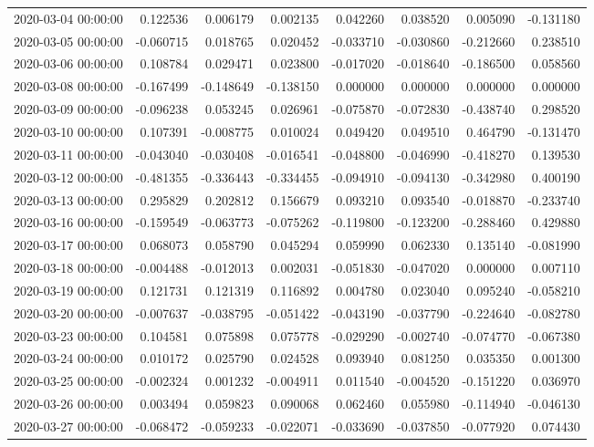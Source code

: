 \begin{tabular}{lrrrrrrr}
2020-03-04 00:00:00 & 0.122536 & 0.006179 & 0.002135 & 0.042260 & 0.038520 & 0.005090 & -0.131180 \\
2020-03-05 00:00:00 & -0.060715 & 0.018765 & 0.020452 & -0.033710 & -0.030860 & -0.212660 & 0.238510 \\
2020-03-06 00:00:00 & 0.108784 & 0.029471 & 0.023800 & -0.017020 & -0.018640 & -0.186500 & 0.058560 \\
2020-03-08 00:00:00 & -0.167499 & -0.148649 & -0.138150 & 0.000000 & 0.000000 & 0.000000 & 0.000000 \\
2020-03-09 00:00:00 & -0.096238 & 0.053245 & 0.026961 & -0.075870 & -0.072830 & -0.438740 & 0.298520 \\
2020-03-10 00:00:00 & 0.107391 & -0.008775 & 0.010024 & 0.049420 & 0.049510 & 0.464790 & -0.131470 \\
2020-03-11 00:00:00 & -0.043040 & -0.030408 & -0.016541 & -0.048800 & -0.046990 & -0.418270 & 0.139530 \\
2020-03-12 00:00:00 & -0.481355 & -0.336443 & -0.334455 & -0.094910 & -0.094130 & -0.342980 & 0.400190 \\
2020-03-13 00:00:00 & 0.295829 & 0.202812 & 0.156679 & 0.093210 & 0.093540 & -0.018870 & -0.233740 \\
2020-03-16 00:00:00 & -0.159549 & -0.063773 & -0.075262 & -0.119800 & -0.123200 & -0.288460 & 0.429880 \\
2020-03-17 00:00:00 & 0.068073 & 0.058790 & 0.045294 & 0.059990 & 0.062330 & 0.135140 & -0.081990 \\
2020-03-18 00:00:00 & -0.004488 & -0.012013 & 0.002031 & -0.051830 & -0.047020 & 0.000000 & 0.007110 \\
2020-03-19 00:00:00 & 0.121731 & 0.121319 & 0.116892 & 0.004780 & 0.023040 & 0.095240 & -0.058210 \\
2020-03-20 00:00:00 & -0.007637 & -0.038795 & -0.051422 & -0.043190 & -0.037790 & -0.224640 & -0.082780 \\
2020-03-23 00:00:00 & 0.104581 & 0.075898 & 0.075778 & -0.029290 & -0.002740 & -0.074770 & -0.067380 \\
2020-03-24 00:00:00 & 0.010172 & 0.025790 & 0.024528 & 0.093940 & 0.081250 & 0.035350 & 0.001300 \\
2020-03-25 00:00:00 & -0.002324 & 0.001232 & -0.004911 & 0.011540 & -0.004520 & -0.151220 & 0.036970 \\
2020-03-26 00:00:00 & 0.003494 & 0.059823 & 0.090068 & 0.062460 & 0.055980 & -0.114940 & -0.046130 \\
2020-03-27 00:00:00 & -0.068472 & -0.059233 & -0.022071 & -0.033690 & -0.037850 & -0.077920 & 0.074430 \\

\end{tabular}

